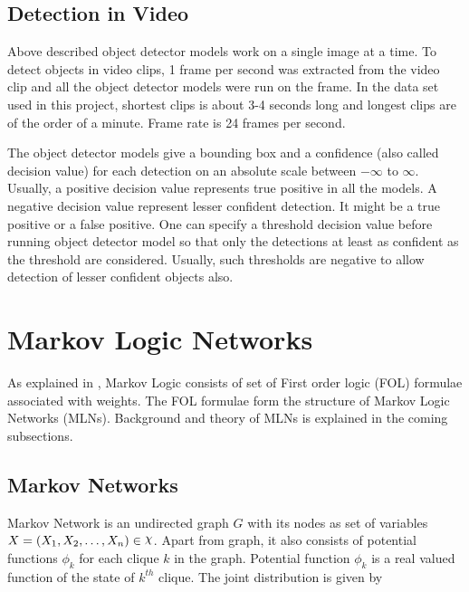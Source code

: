 \subsection{Detection in Video}
Above described object detector models work on a single image at a time. To detect objects in video clips, 1 frame per second was extracted from the video clip and all the object detector models were run on the frame. In the data set used in this project, shortest clips is about 3-4 seconds long and longest clips are of the order of a minute. Frame rate is 24 frames per second.

The object detector models give a bounding box and a confidence (also called decision value) for each detection 
on an absolute scale between $-\infty$ to $\infty$. 
Usually, a positive decision value represents true positive in all the models. 
A negative decision value represent lesser confident detection. 
It might be a true positive or a false positive. 
One can specify a threshold decision value before running object detector model 
so that only the detections at least as confident as the threshold are considered.
Usually, such thresholds are negative to allow detection of lesser confident objects also.

\section{Markov Logic Networks}

\label{section_MLN}


As explained in \cite{MarkovLogic}, Markov Logic consists of set of First order
logic (FOL) formulae associated with weights. The FOL formulae form the structure 
of Markov Logic Networks (MLNs). Background and theory of MLNs
is explained in the coming subsections.

\subsection{Markov Networks}
Markov Network is an undirected graph $G$ with its nodes as set of variables $X = (X_1, X_2,\ldots, X_n) \in \rchi $.
Apart from graph, it also consists of potential functions $\phi_k$ for each clique $k$ in the graph.
Potential function $\phi_k$ is a real valued function of the state of $k^{th}$ clique.
The joint distribution is given by

